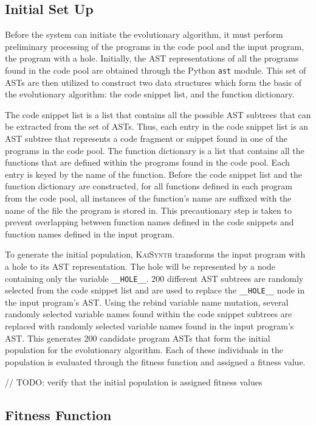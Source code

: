 \documentclass{article}
\begin{document}
\subsection{Initial Set Up}

Before the system can initiate the evolutionary algorithm, it must perform preliminary processing of the programs in the code pool and the input program, the program with a hole. Initially, the AST representations of all the programs found in the code pool are obtained through the Python \texttt{ast} module. This set of ASTs are then utilized to construct two data structures which form the basis of the evolutionary algorithm: the code snippet list, and the function dictionary.

The code snippet list is a list that contains all the possible AST subtrees that can be extracted from the set of ASTs. Thus, each entry in the code snippet list is an AST subtree that represents a code fragment or snippet found in one of the programs in the code pool. The function dictionary is a list that contains all the functions that are defined within the programs found in the code pool. Each entry is keyed by the name of the function. Before the code snippet list and the function dictionary are constructed, for all functions defined in each program from the code pool, all instances of the function's name are suffixed with the name of the file the program is stored in. This precautionary step is taken to prevent overlapping between function names defined in the code snippets and function names defined in the input program.

To generate the initial population, \textsc{KaiSynth} transforms the input program with a hole to its AST representation. The hole will be represented by a node containing only the variable \texttt{\_\_HOLE\_\_}. 200 different AST subtrees are randomly selected from the code snippet list and are used to replace the \texttt{\_\_HOLE\_\_} node in the input program's AST. Using the rebind variable name mutation, several randomly selected variable names found within the code snippet subtrees are replaced with randomly selected variable names found in the input program's AST. This generates 200 candidate program ASTs that form the initial population for the evolutionary algorithm. Each of these individuals in the population is evaluated through the fitness function and assigned a fitness value.

// TODO: verify that the initial population is assigned fitness values

\subsection{Fitness Function}
\end{document}
